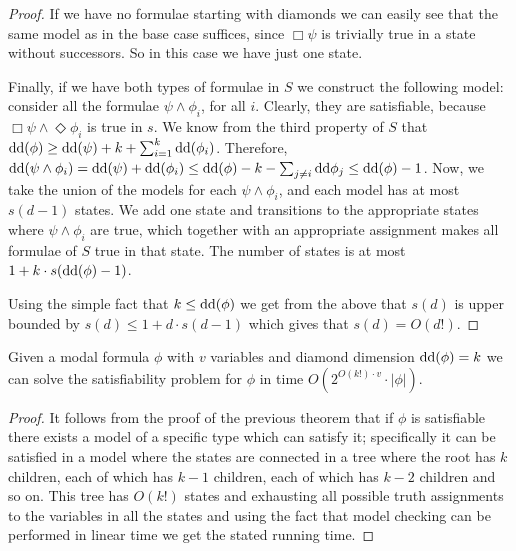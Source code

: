 \documentclass{llncs}
\newcommand{\dd}{\ensuremath \textrm{dd}}
\begin{document}
\begin{proof}
If we have no formulae starting with diamonds we can easily see that the same
model as in the base case suffices, since $\Box \psi$ is trivially true in a
state without successors. So in this case we have just one state.

Finally, if we have both types of formulae in $S$ we construct the
following model: consider all the formulae $\psi \land \phi_i$, for
all $i$. Clearly, they are satisfiable, because $\Box \psi \land
\Diamond \phi_i$ is true in $s$. We know from the third property of
$S$ that $\dd(\phi) \ge \dd(\psi) + k + \sum_{i=1}^k \dd(\phi_i)$.
Therefore, $\dd(\psi \land \phi_i) = \dd(\psi) + \dd(\phi_i) \le
\dd(\phi) -k - \sum_{j\neq i} \dd{\phi_j}\le \dd(\phi)-1$. Now, we
take the union of the models for each $\psi\land\phi_i$, and each
model has at most $s(d-1)$ states. We add one state and transitions
to the appropriate states where $\psi\land \phi_i$ are true, which
together with an appropriate assignment makes all formulae of $S$
true in that state. The number of states is at most $1+k\cdot
s(\dd(\phi)-1)$.

Using the simple fact that $k\le \dd(\phi)$ we get from the above that $s(d)$
is upper bounded by $s(d)\le 1+ d\cdot s(d-1)$ which gives that $s(d)=O(d!)$.


\end{proof}

\begin{corollary}

Given a modal formula $\phi$ with $v$ variables and diamond
dimension $\dd(\phi)=k$ we can solve the satisfiability problem for
$\phi$ in time $O(2^{O(k!)\cdot v}\cdot|\phi|)$.

\end{corollary}

\begin{proof}

It follows from the proof of the previous theorem that if $\phi$ is
satisfiable there exists a model of a specific type which can
satisfy it; specifically it can be satisfied in a model where the
states are connected in a tree where the root has $k$ children, each
of which has $k-1$ children, each of which has $k-2$ children and so
on. This tree has $O(k!)$ states and exhausting all possible truth
assignments to the variables in all the states and using the fact
that model checking can be performed in linear time we get the stated running
time.

\end{proof}
\end{document}
